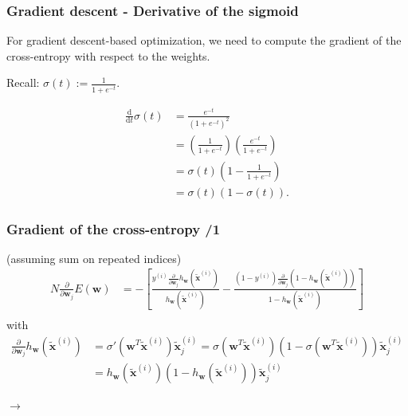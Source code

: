 \documentclass{beamer}
\begin{document}
	\begin{frame}
		\frametitle{Gradient descent - Derivative of the sigmoid}
		For gradient descent-based optimization, we need to compute the gradient of the cross-entropy with respect to the weights.
		
		\vspace{5mm}
		
		Recall: $\sigma(t) := \frac{1}{1+e^{-t}}$.
		
		\begin{align*}
			\frac{\textrm{d}}{\textrm{d}t} \sigma(t) &= \frac{e^{-t}}{(1 + e^{-t})^2}\\
			&= \left(\frac{1}{1 + e^{-t}}\right)\left(\frac{e^{-t}}{1 + e^{-t}}\right)\\
			&= \sigma(t)\left(1 - \frac{1}{1 + e^{-t}}\right)\\
			&= \sigma(t)(1 - \sigma(t)).
		\end{align*}
		
	\end{frame}

	\begin{frame}
		\frametitle{Gradient of the cross-entropy /1}
	
		(assuming sum on repeated indices)
		\begin{align*}
			N\frac{\partial}{\partial \bm{w}_j} E(\bm{w}) &= - \left[\frac{y^{(i)} \frac{\partial}{\partial \bm{w}_j}h_{\bm{w}}(\tilde{\bm{x}}^{(i)})}{h_{\bm{w}}(\tilde{\bm{x}}^{(i)})} - \frac{(1-y^{(i)}) \frac{\partial}{\partial \bm{w}_j}(1 -h_{\bm{w}}(\tilde{\bm{x}}^{(i)}))}{1-h_{\bm{w}}(\tilde{\bm{x}}^{(i)})}\right]\\
		\end{align*}
		with
		\begin{align*}
			\frac{\partial}{\partial \bm{w}_j} h_{\bm{w}}(\tilde{\bm{x}}^{(i)}) &= \sigma'(\bm{w}^T \tilde{\bm{x}}^{(i)}) \tilde{\bm{x}}^{(i)}_j = \sigma(\bm{w}^T\tilde{\bm{x}}^{(i)})(1 - \sigma(\bm{w}^T \tilde{\bm{x}}^{(i)}))\tilde{\bm{x}}^{(i)}_j\\
			&= h_{\bm{w}}(\tilde{\bm{x}}^{(i)})(1 - h_{\bm{w}}(\tilde{\bm{x}}^{(i)}))\tilde{\bm{x}}^{(i)}_j 
		\end{align*}
	
	\mbox{}\hfill $\rightarrow$
	
	\end{frame}
\end{document}
